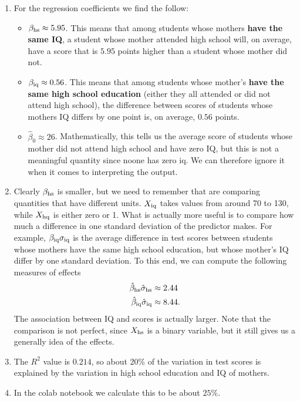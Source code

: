 \begin{example}
\begin{Verbatim}
\end{Verbatim}
\vspace{1cm}
\begin{enumerate}[label=(\alph*)]
\item For the regression coefficients we find the follow:
\begin{itemize}
\item $\beta_{\rm hs} \approx 5.95$. This means that among students whose mothers {\bf have the same IQ}, a student whose mother attended high school will, on average, have a score that is $5.95$ points higher than a student whose mother did not. 
\item $\beta_{\rm iq} \approx 0.56$. This means that among students whose mother's {\bf have the same high school education} (either they all attended or did not attend high school), the difference between scores of students whose mothers IQ differs by one point is, on average, $0.56$ points.
\item $\hat{\beta}_0 \approx 26$. Mathematically, this tells us the average score of students whose mother did not attend high school and have zero IQ, but this is not a meaningful quantity since noone has zero iq. We can therefore ignore it when it comes to interpreting the output. 
\end{itemize}
\item Clearly $\beta_{\rm hs}$ is smaller, but we need to remember that are comparing quantities that have different units. $X_{\rm iq}$ takes values from around 70 to 130, while $X_{\rm hq}$ is either zero or 1. What is actually more useful is to compare how much a difference in one standard deviation of the predictor makes. For example, $\beta_{\rm iq}\sigma_{\rm iq}$ is the average difference in test scores between students whose mothers have the same high school education, but whose mother's IQ differ by one standard deviation. To this end, we can compute the following measures of effects
\begin{align*}
\hat{\beta}_{\rm hs}\hat{\sigma}_{\rm hs} &\approx 2.44\\
\hat{\beta}_{\rm iq}\hat{\sigma}_{\rm iq} &\approx 8.44.
\end{align*}
The association between IQ and scores is actually larger. Note that the comparison is not perfect, since $X_{\rm hs}$ is a binary variable, but it still gives us a generally idea of the effects. \\
\item The $R^2$ value is $0.214$, so about $20\%$ of the variation in test scores is explained by the variation in high school education and IQ of mothers. 
\item In the colab notebook we calculate this to be about $25\%$. 
\end{enumerate}
\end{example}


